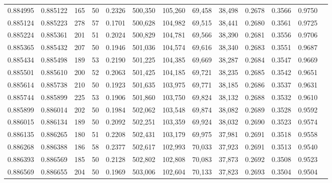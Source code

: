 \begin{tabular}{rrrrrrrrrrrrr}
0.884995 & 0.885122 &   165 &  50 &                                     0.2326 & 500,350 & 105,260 &  69,458 &  38,498 & 0.2678 & 0.3566 & 0.9750 \\
0.885124 & 0.885223 &   278 &  57 &                                     0.1701 & 500,628 & 104,982 &  69,515 &  38,441 & 0.2680 & 0.3561 & 0.9725 \\
0.885224 & 0.885361 &   201 &  51 &                                     0.2024 & 500,829 & 104,781 &  69,566 &  38,390 & 0.2681 & 0.3556 & 0.9706 \\
0.885365 & 0.885432 &   207 &  50 &                                     0.1946 & 501,036 & 104,574 &  69,616 &  38,340 & 0.2683 & 0.3551 & 0.9687 \\
0.885434 & 0.885498 &   189 &  53 &                                     0.2190 & 501,225 & 104,385 &  69,669 &  38,287 & 0.2684 & 0.3547 & 0.9669 \\
0.885501 & 0.885610 &   200 &  52 &                                     0.2063 & 501,425 & 104,185 &  69,721 &  38,235 & 0.2685 & 0.3542 & 0.9651 \\
0.885614 & 0.885738 &   210 &  50 &                                     0.1923 & 501,635 & 103,975 &  69,771 &  38,185 & 0.2686 & 0.3537 & 0.9631 \\
0.885744 & 0.885899 &   225 &  53 &                                     0.1906 & 501,860 & 103,750 &  69,824 &  38,132 & 0.2688 & 0.3532 & 0.9610 \\
0.885899 & 0.886014 &   202 &  50 &                                     0.1984 & 502,062 & 103,548 &  69,874 &  38,082 & 0.2689 & 0.3528 & 0.9592 \\
0.886015 & 0.886134 &   189 &  50 &                                     0.2092 & 502,251 & 103,359 &  69,924 &  38,032 & 0.2690 & 0.3523 & 0.9574 \\
0.886135 & 0.886265 &   180 &  51 &                                     0.2208 & 502,431 & 103,179 &  69,975 &  37,981 & 0.2691 & 0.3518 & 0.9558 \\
0.886268 & 0.886388 &   186 &  58 &                                     0.2377 & 502,617 & 102,993 &  70,033 &  37,923 & 0.2691 & 0.3513 & 0.9540 \\
0.886393 & 0.886569 &   185 &  50 &                                     0.2128 & 502,802 & 102,808 &  70,083 &  37,873 & 0.2692 & 0.3508 & 0.9523 \\
0.886569 & 0.886655 &   204 &  50 &                                     0.1969 & 503,006 & 102,604 &  70,133 &  37,823 & 0.2693 & 0.3504 & 0.9504 \\

\end{tabular}
